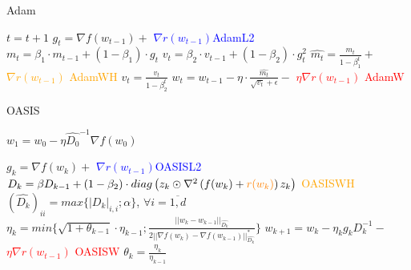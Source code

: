 \documentclass{article}
\begin{document}
\begin{algorithm}[h]
            
            \caption{Adam}\label{alg:genAdam}
    
            \begin{algorithmic}
            \small{
            \State $t = t+1$
            \State $g_t = \nabla f(w_{t-1}) + $ \textcolor{blue}{$\nabla r(w_{t-1})$}\hfill \textcolor{blue}{AdamL2}
            \State $m_t = \beta_1 \cdot m_{t-1} + (1 - \beta_1) \cdot g_t$
            \State $v_t = \beta_2 \cdot v_{t-1} + (1 - \beta_2) \cdot g_t^2$
            \State $\hat{m_t} = \frac{m_t}{1-\beta_1^t} +$ \textcolor{orange}{$\nabla r(w_{t-1})$} \hfill \textcolor{orange}{AdamWH}
            \State $\hat{v_t} = \frac{v_t}{1-\beta_2^t}$ 
            \State $w_t = w_{t-1} - \eta \cdot \frac{\hat{m_t}}{\sqrt{v_t} + \epsilon} - $ \textcolor{red}{$\eta \nabla r(w_{t-1})$ } \hfill \textcolor{red}{AdamW}
            \EndWhile
            }
\end{algorithmic}
\end{algorithm}

\begin{algorithm}[h]
\caption{OASIS}\label{alg:OASIS}
\begin{algorithmic}
    \State $w_1 = w_0 - \eta \hat{D_0}^{-1} \nabla f(w_0)$

    \State $g_k = \nabla f(w_k) +$ \textcolor{blue}{$\nabla r(w_{t-1})$}\hfill \textcolor{blue}{OASISL2} 
    \State $D_k = \beta D_{k-1} + (1-\beta_2) \cdot diag\left( z_k \odot \nabla^2 \left(f(w_k) + \textcolor{orange}{r(w_k)} \right) z_k \right)$ \hfill \textcolor{orange}{OASISWH}
    \State $(\hat{D_k})_{ii} = max \{|D_k|_{i, i} ; \alpha \}$, $\forall i = \overline{1, d}$
    \State $\eta_k = min \{ \sqrt{1 + \theta_{k-1}} \cdot \eta_{k-1}; \frac{||w_k - w_{k-1}||_{\hat{D_k}}}{2 ||\nabla f(w_k) - \nabla f(w_{k-1}) ||_{\hat{D_k}}^* } \}$
    \State $w_{k+1} = w_k - \eta_k g_k D_k^{-1}- $ \textcolor{red}{$\eta \nabla r(w_{t-1})$ } \hfill \textcolor{red}{OASISW} 
    \State $\theta_k = \frac{\eta_k}{\eta_{k-1}}$
    \EndFor
    
\end{algorithmic}
\end{algorithm}
\end{document}
